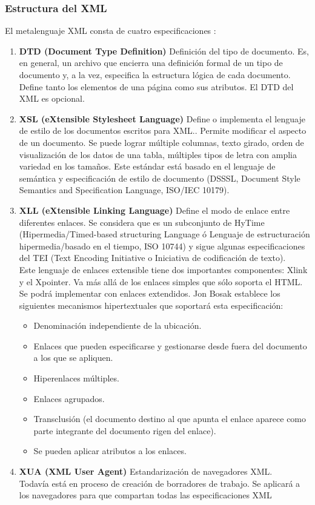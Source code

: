 \subsubsection*{Estructura del XML}

El metalenguaje XML consta de cuatro especificaciones :
\begin{enumerate}[1.]
\item \textbf{DTD (Document Type Definition)} Definición del tipo de documento. Es, en general, un archivo que encierra una definición formal de un tipo de documento y, a la vez, especifica la estructura lógica de cada documento. Define tanto los elementos de una página como sus atributos. El DTD del XML es opcional. 

\item \textbf{XSL (eXtensible Stylesheet Language)} Define o implementa el lenguaje de estilo de los documentos escritos para XML.. Permite modificar el aspecto de un documento.
Se puede lograr múltiple columnas, texto girado, orden de visualización de los datos de una tabla, múltiples tipos de letra con amplia variedad en los tamaños. Este estándar está basado en el lenguaje de semántica y especificación de estilo de documento (DSSSL, Document Style Semantics  and Specification Language, ISO/IEC 10179).

\item \textbf{XLL (eXtensible Linking Language)} Define el modo de enlace entre diferentes enlaces. Se considera que es un subconjunto de HyTime (Hipermedia/Timed-based structuring Language ó Lenguaje de estructuración hipermedia/basado en el tiempo, ISO 10744) y sigue algunas especificaciones del TEI (Text Encoding Initiative o Iniciativa de codificación de texto). \\
Este lenguaje de enlaces extensible tiene dos importantes componentes: Xlink y el Xpointer. Va más allá de los enlaces simples que sólo soporta el HTML. Se podrá implementar con enlaces extendidos. Jon Bosak establece los siguientes mecanismos hipertextuales que soportará esta especificación:\\
\begin{itemize}
	\item Denominación independiente de la ubicación.
	\item Enlaces que pueden especificarse y gestionarse desde fuera del documento a los que se apliquen.
	\item Hiperenlaces múltiples.
	\item Enlaces agrupados.
	\item Transclusión (el documento destino al que apunta el enlace aparece como parte integrante del documento rigen del enlace).
	\item Se pueden aplicar atributos a los enlaces.
\end{itemize}


\item \textbf{XUA (XML User Agent)} Estandarización de navegadores XML.\\
Todavía está en proceso de creación de borradores de trabajo. Se aplicará a los navegadores para que compartan todas las especificaciones XML
\end{enumerate}

